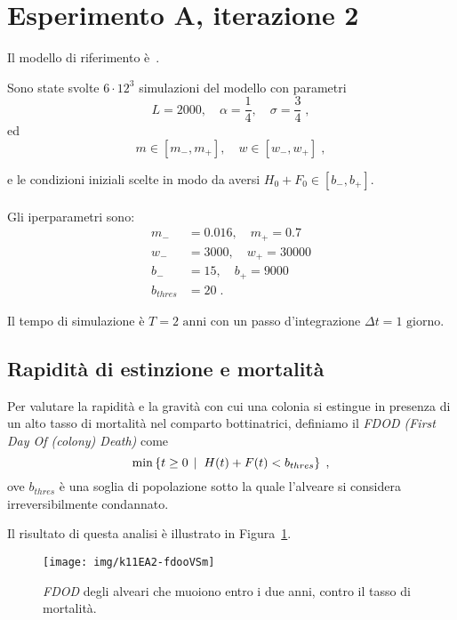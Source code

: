 \section{Esperimento A, iterazione 2}
Il modello di riferimento è~\cite{khoury2011}.

Sono state svolte $6 \cdot 12^{3}$ simulazioni del modello con parametri
$$L = 2000, \quad \alpha = \frac{1}{4}, \quad \sigma = \frac{3}{4} \; ,$$
ed
$$m \in \left[ m_-, m_+ \right], \quad w \in \left[ w_-, w_+ \right] \; ,$$

e le condizioni iniziali scelte in modo da aversi $H_0+F_0 \in \left[ b_-, b_+ \right]$.

\paragraph{}
Gli iperparametri sono:
\begin{equation*}
\begin{split}
m_- &= 0.016, \quad m_+ = 0.7 \\
w_- &= 3000, \quad w_+ = 30000 \\
b_- &= 15, \quad b_+ = 9000 \\
b_{thres} &= 20 \; .
\end{split}
\end{equation*}

Il tempo di simulazione è $T=2 \text{ anni}$ con un passo d'integrazione $\Delta t = 1 \text{ giorno}$.

\subsection{Rapidità di estinzione e mortalità}
Per valutare la rapidità e la gravità con cui una colonia si estingue in presenza di un alto tasso di
mortalità nel comparto bottinatrici, definiamo il \emph{FDOD (First Day Of (colony) Death)} come
$$\min \left\{ t \geq 0 \,\mid\; H(t) + F(t) < b_{thres} \right\} \; ,$$
ove $b_{thres}$ è una soglia di popolazione sotto la quale l'alveare si considera
irreversibilmente condannato.

Il risultato di questa analisi è illustrato in Figura~\ref{img:kh11expA21}.

\begin{figure}[pbh]
    \centering
    \texttt{[image: img/k11EA2-fdooVSm]}

    \caption[Esperimento A2, \emph{FDOD} vs. mortalità.]{\emph{FDOD} degli alveari che muoiono entro i due anni,
        contro il tasso di mortalità.}

    \label{img:kh11expA21}
\end{figure}

